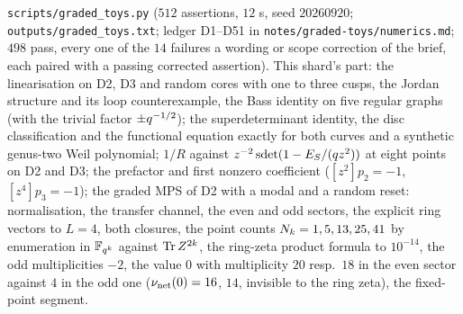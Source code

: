 \begin{numerical}
\label{num:graded-toys-network}
\texttt{scripts/graded\_toys.py} ($512$ assertions, $12$ s, seed $20260920$; \texttt{outputs/graded\_toys.txt};
ledger D1--D51 in \texttt{notes/graded-toys/numerics.md}; $498$ pass, every one of the $14$ failures a wording or scope
correction of the brief, each paired with a passing corrected assertion). This shard's part: the linearisation on D2, D3
and random cores with one to three cusps, the Jordan structure and its loop counterexample, the Bass identity on five
regular graphs (with the trivial factor $\pm q^{-1/2}$); the superdeterminant identity, the disc classification and the
functional equation exactly for both curves and a synthetic genus-two Weil polynomial; $1/R$ against
$z^{-2}\operatorname{sdet}(1-E_S/(q z^2))$ at eight points on D2 and D3; the prefactor and first nonzero coefficient ($[z^2]p_2 = -1$,
$[z^4]p_3 = -1$); the graded MPS of D2 with a modal and a random reset: normalisation, the transfer channel, the even and
odd sectors, the explicit ring vectors to $L = 4$, both closures, the point counts $N_{k} = 1, 5, 13, 25, 41$ by
enumeration in $\mathbb F_{q^{k}}$ against $\operatorname{Tr} Z^{2k}$, the ring-zeta product formula to $10^{-14}$, the odd multiplicities
$-2$, the value $0$ with multiplicity $20$ resp.\ $18$ in the even sector against $4$ in the odd one ($\nu_{\mathrm{net}}(0) = 16$,
$14$, invisible to the ring zeta), the fixed-point segment.
\end{numerical}
